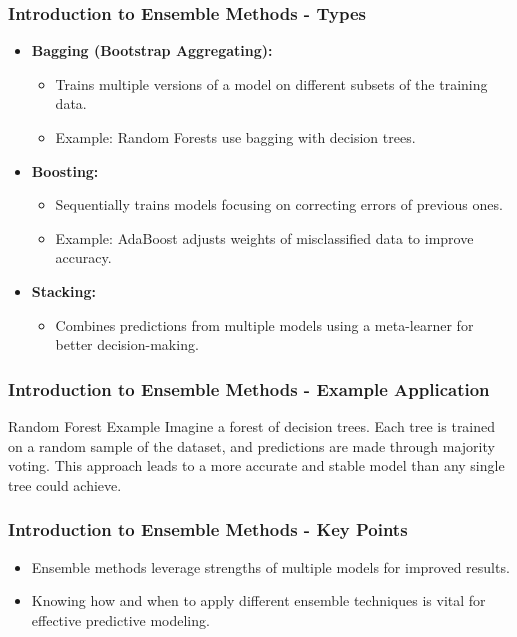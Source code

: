 \documentclass{beamer}
\begin{document}
\begin{frame}[fragile]
    \frametitle{Introduction to Ensemble Methods - Types}
    \begin{itemize}
        \item \textbf{Bagging (Bootstrap Aggregating):}
        \begin{itemize}
            \item Trains multiple versions of a model on different subsets of the training data.
            \item Example: Random Forests use bagging with decision trees.
        \end{itemize}
        
        \item \textbf{Boosting:}
        \begin{itemize}
            \item Sequentially trains models focusing on correcting errors of previous ones.
            \item Example: AdaBoost adjusts weights of misclassified data to improve accuracy.
        \end{itemize}
        
        \item \textbf{Stacking:}
        \begin{itemize}
            \item Combines predictions from multiple models using a meta-learner for better decision-making.
        \end{itemize}
    \end{itemize}
\end{frame}

\begin{frame}[fragile]
    \frametitle{Introduction to Ensemble Methods - Example Application}
    \begin{block}{Random Forest Example}
        Imagine a forest of decision trees. Each tree is trained on a random sample of the dataset, and predictions are made through majority voting. This approach leads to a more accurate and stable model than any single tree could achieve.
    \end{block}
\end{frame}

\begin{frame}[fragile]
    \frametitle{Introduction to Ensemble Methods - Key Points}
    \begin{itemize}
        \item Ensemble methods leverage strengths of multiple models for improved results.
        \item Knowing how and when to apply different ensemble techniques is vital for effective predictive modeling.
    \end{itemize}
\end{frame}
\end{document}
